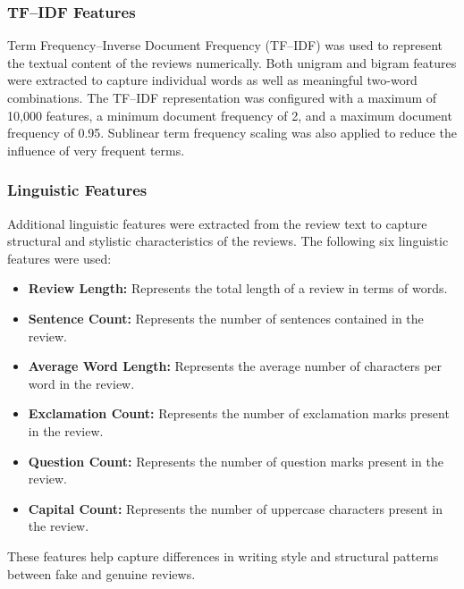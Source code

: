 \documentclass[12pt,a4paper]{report}
\begin{document}
\subsubsection*{TF--IDF Features}

Term Frequency--Inverse Document Frequency (TF--IDF) was used to represent the textual content of the reviews numerically. Both unigram and bigram features were extracted to capture individual words as well as meaningful two-word combinations. The TF--IDF representation was configured with a maximum of 10,000 features, a minimum document frequency of 2, and a maximum document frequency of 0.95. Sublinear term frequency scaling was also applied to reduce the influence of very frequent terms.

\subsubsection*{Linguistic Features}

Additional linguistic features were extracted from the review text to capture structural and stylistic characteristics of the reviews. The following six linguistic features were used:

\begin{itemize}
    \item \textbf{Review Length:} Represents the total length of a review in terms of words.
    
    \item \textbf{Sentence Count:} Represents the number of sentences contained in the review.
    
    \item \textbf{Average Word Length:} Represents the average number of characters per word in the review.
    
    \item \textbf{Exclamation Count:} Represents the number of exclamation marks present in the review.
    
    \item \textbf{Question Count:} Represents the number of question marks present in the review.
    
    \item \textbf{Capital Count:} Represents the number of uppercase characters present in the review.
\end{itemize}

These features help capture differences in writing style and structural patterns between fake and genuine reviews.
\end{document}
